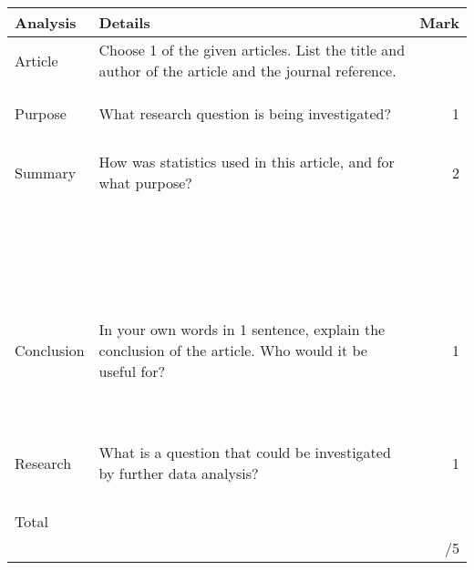 \documentclass[bigtut]{quiz}\usepackage[]{graphicx}\usepackage[]{color}
\begin{document}
\begin{tutorial}
\begin{tabular}{|l|l|r|} \hline
{\bf Analysis} & {\bf Details} \hspace{11cm} & {\bf Mark} \\ \hline
Article & {\tiny Choose 1 of the given articles. List the title and author of the article and the journal reference.} &   \\
& & \\
& & \\ 
& & \\  \hline
Purpose & {\tiny What research question is being investigated?} & 1 \\
& & \\ 
& & \\ 
& & \\ 
& & \\ \hline
Summary & {\tiny How was statistics used in this article, and for what purpose?} & 2 \\
& & \\ 
& & \\ 
& & \\
& & \\ 
& & \\ 
& & \\ 
& & \\ 
& & \\ 
& & \\ 
& & \\ 
& & \\ 
& & \\ 
& & \\ 
& & \\ 
& & \\ 
& & \\ 
& & \\
& & \\ 
& & \\ 
& & \\
& & \\
& & \\\hline
Conclusion & {\tiny In your own words in 1 sentence, explain the conclusion of the article. Who would it be useful for?} & 1 \\
& & \\ 
& & \\
& & \\ 
& & \\ 
& & \\ 
& & \\ 
& & \\ 
& & \\
& & \\
& & \\ \hline
Research & {\tiny What is a question that could be investigated by further data analysis?} & 1 \\
&  &  \\ 
& & \\
& & \\ 
& & \\ \hline
Total & &  \\ 
& & /5 \\ \hline
\end{tabular}





\end{tutorial}
\end{document}
